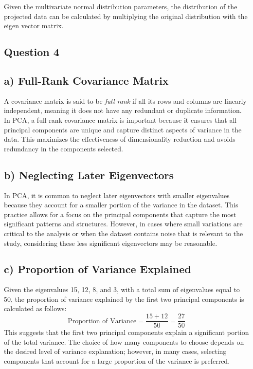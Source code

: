 \documentclass{article}
\begin{document}
Given the multivariate normal distribution parameters, the distribution of the projected data can be calculated by multiplying the original distribution with the eigen vector matrix.

\subsection*{Question 4}

\subsection*{a) Full-Rank Covariance Matrix}
A covariance matrix is said to be \textit{full rank} if all its rows and columns are linearly independent, meaning it does not have any redundant or duplicate information. In PCA, a full-rank covariance matrix is important because it ensures that all principal components are unique and capture distinct aspects of variance in the data. This maximizes the effectiveness of dimensionality reduction and avoids redundancy in the components selected.

\subsection*{b) Neglecting Later Eigenvectors}
In PCA, it is common to neglect later eigenvectors with smaller eigenvalues because they account for a smaller portion of the variance in the dataset. This practice allows for a focus on the principal components that capture the most significant patterns and structures. However, in cases where small variations are critical to the analysis or when the dataset contains noise that is relevant to the study, considering these less significant eigenvectors may be reasonable.

\subsection*{c) Proportion of Variance Explained}
Given the eigenvalues 15, 12, 8, and 3, with a total sum of eigenvalues equal to 50, the proportion of variance explained by the first two principal components is calculated as follows:
\[
\text{Proportion of Variance} = \frac{15 + 12}{50} = \frac{27}{50}
\]
This suggests that the first two principal components explain a significant portion of the total variance. The choice of how many components to choose depends on the desired level of variance explanation; however, in many cases, selecting components that account for a large proportion of the variance is preferred.
\end{document}
